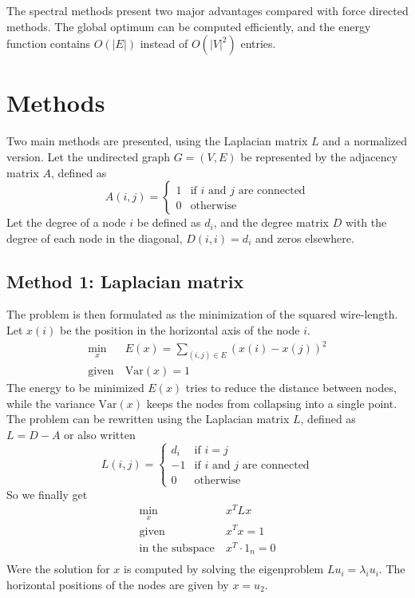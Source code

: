 \documentclass[a4paper,twocolumn]{article}
\begin{document}
The spectral methods present two major advantages compared with force directed 
methods. The global optimum can be computed efficiently, and the energy function 
contains $O(|E|)$ instead of $O(|V|^2)$ entries.

\section{Methods}

Two main methods are presented, using the Laplacian matrix $L$ and a normalized 
version. Let the undirected graph $G = (V, E)$ be represented by the adjacency 
matrix $A$, defined as
\begin{equation}
A(i,j) =
\begin{cases}
	1 & \text{if $i$ and $j$ are connected} \\
	0 & \text{otherwise}
\end{cases}
\end{equation}
Let the degree of a node $i$ be defined as $d_i$, and the degree matrix $D$ with 
the degree of each node in the diagonal, $D(i,i) = d_i$ and zeros elsewhere.  

\subsection{Method 1: Laplacian matrix}

The problem is then formulated as the minimization of the squared wire-length.  
Let $x(i)$ be the position in the horizontal axis of the node $i$.
%
\begin{equation}
\begin{split}
\min_x \  & E(x) = \sum_{(i,j) \in E} (x(i) - x(j))^2 \\
\textrm{given} \ & \textrm{Var}(x) = 1
\end{split}
\end{equation}
%
The energy to be minimized $E(x)$ tries to reduce the distance between nodes, 
while the variance $\textrm{Var}(x)$ keeps the nodes from collapsing into a 
single point. The problem can be rewritten using the Laplacian matrix $L$, 
defined as $L = D - A$ or also written
%
\begin{equation}
L(i,j) =
\begin{cases}
	d_i & \text{if $i = j$} \\
	-1 & \text{if $i$ and $j$ are connected} \\
	0 & \text{otherwise}
\end{cases}
\end{equation}
%
So we finally get
%
\begin{equation}
\begin{split}
\min_x \  & x^T L x \\
\textrm{given} \ & x^T x = 1 \\
\textrm{in the subspace} \ & x^T \cdot 1_n = 0 \\
\end{split}
\end{equation}
%
Were the solution for $x$ is computed by solving the eigenproblem $L u_i = 
\lambda_i u_i$. The horizontal positions of the nodes are given by $x = u_2$.
\end{document}
